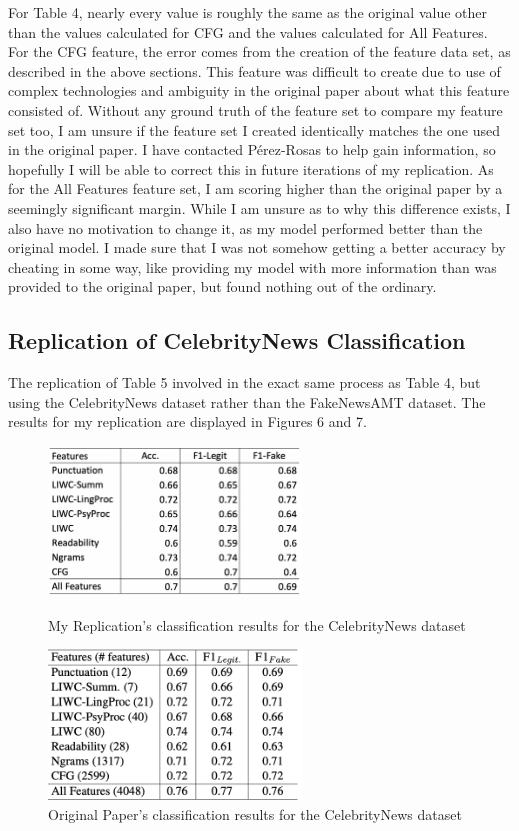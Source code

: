 \documentclass{article}
\begin{document}
For Table 4, nearly every value is roughly the same as the original value other than the values calculated for CFG and the values calculated for All Features. For the CFG feature, the error comes from the creation of the feature data set, as described in the above sections. This feature was difficult to create due to use of complex technologies and ambiguity in the original paper about what this feature consisted of. Without any ground truth of the feature set to compare my feature set too, I am unsure if the feature set I created identically matches the one used in the original paper. I have contacted P\'erez-Rosas to help gain information, so hopefully I will be able to correct this in future iterations of my replication. As for the All Features feature set, I am scoring higher than the original paper by a seemingly significant margin. While I am unsure as to why this difference exists, I also have no motivation to change it, as my model performed better than the original model. I made sure that I was not somehow getting a better accuracy by cheating in some way, like providing my model with more information than was provided to the original paper, but found nothing out of the ordinary. 

\subsection{Replication of CelebrityNews Classification}

The replication of Table 5 involved in the exact same process as Table 4, but using the CelebrityNews dataset rather than the FakeNewsAMT dataset. The results for my replication are displayed in Figures 6 and 7.

\begin{figure}[]
  \centering
  \begin{minipage}[b]{0.4\textwidth}
    \includegraphics[height=4cm, width=\textwidth]{Results_For_Paper/Table5Me.png}
    \caption{My Replication's classification results for the CelebrityNews dataset}
  \end{minipage}
  \hfill
  \begin{minipage}[b]{0.4\textwidth}
    \includegraphics[height=4cm, width=\textwidth]{Results_For_Paper/Table5Real.png}
    \caption{Original Paper's classification results for the CelebrityNews dataset}
  \end{minipage}
\end{figure}
\end{document}
